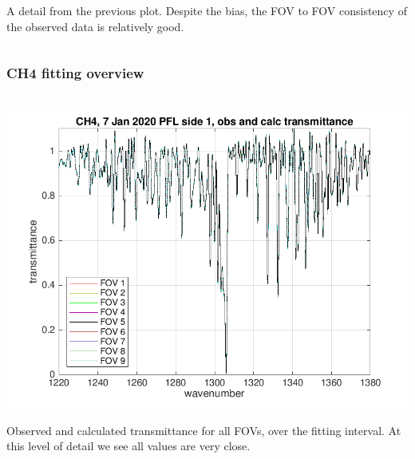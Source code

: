 \documentclass[10pt]{beamer}
\begin{document}
\begin{frame}
\begin{columns}[t]
\begin{column}{0.5\textwidth}
A detail from the previous plot. Despite the bias, the FOV to FOV
consistency of the observed data is relatively good.

\end{column}
\end{columns}
\end{frame}
\begin{frame}
\frametitle{CH4 fitting overview}
\begin{columns}[t]
\begin{column}{0.5\textwidth}  
  \begin{centering}
  \includegraphics[width=\textwidth]{figures/CH4_obs_and_calc.png}
  \end{centering}\vspace{3mm}

Observed and calculated transmittance for all FOVs, over the fitting
interval.  At this level of detail we see all values are very close.

\end{column}


\end{columns}
\end{frame}
\end{document}
